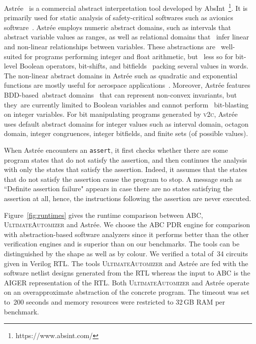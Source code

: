 Astr{\'e}e~\cite{DBLP:conf/esop/CousotCFMMMR05} is a commercial abstract 
interpretation tool developed by AbsInt~\footnote{https://www.absint.com/}.  
It is primarily used for static analysis of safety-critical softwares 
such as avionics software~\cite{DBLP:journals/corr/abs-cs-0701193}.
Astr{\'e}e employs numeric abstract domains, such as intervals that  
abstract variable values as ranges, as well as relational domains that  
infer linear and non-linear relationships between variables. These abstractions are  
well-suited for programs performing integer and float arithmetic, but  
less so for bit-level Boolean operators, bit-shifts, and bitfields  
packing several values in words.  The non-linear abstract domains in 
Astr{\'e}e such as quadratic and exponential functions are mostly useful 
for aerospace applications~\cite{DBLP:journals/ftpl/BertraneCCFMMR15}.  
Moreover, Astr{\'e}e features BDD-based abstract 
domains~\cite{bdd-domain} that can represent non-convex invariants, 
but they are currently limited to Boolean variables and cannot perform  
bit-blasting on integer variables.  For bit manipulating programs 
generated by \textsc{v2c}, Astr{\'e}e uses default abstract domains 
for integer values such as interval domain, octagon domain, integer 
congruences, integer bitfields, and finite sets (of possible values).


When Astr{\'e}e encounters an \texttt{assert}, it first checks whether 
there are some program states that do not satisfy the assertion, and 
then continues the analysis with only the states that satisfy the assertion. 
Indeed, it assumes that the states that do not satisfy the assertion cause 
the program to stop.  A message such as ``Definite assertion failure" appears 
in case there are no states satisfying the assertion at all, hence, the 
instructions following the assertion are never executed.


Figure~\ref{fig:runtimes} gives the runtime comparison between 
ABC, \textsc{UltimateAutomizer} and Astr{\'e}e.  We choose 
the ABC PDR engine for comparison with abstraction-based software 
analyzers since it performs better than the other verification engines 
and is superior than \ebmc on our benchmarks. The tools can be distinguished 
by the shape as well as by colour. 
%
We verified a total of~34 circuits given in Verilog RTL. 
The tools \textsc{UltimateAutomizer} and Astr{\'e}e are fed with the 
software netlist designs generated from the RTL whereas the input to 
ABC is the AIGER representation of the RTL. 
% 
Both \textsc{UltimateAutomizer} and Astr{\'e}e operate 
on an overapproximate abstraction of the concrete program.  
The timeout was set to~200 seconds and memory resources 
were restricted to 32\,GB RAM per benchmark. 


